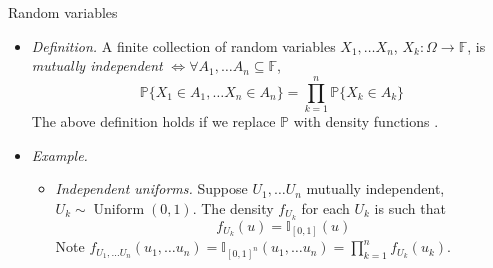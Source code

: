 \documentclass{beamer}
\numberwithin{equation}{section}
\begin{document}
\begin{frame}{Random variables}
    \begin{itemize}
        \item
        \textit{Definition.} A finite collection of random variables
        $ X_1, \ldots X_n $, $ X_k : \Omega \rightarrow \mathbb{F} $, is
        \textit{mutually independent} $ \Leftrightarrow \forall A_1, \ldots
        A_n \subseteq \mathbb{F} $,
        \begin{equation*}
            \mathbb{P}\{X_1 \in A_1, \ldots X_n \in A_n\} =
            \prod_{k = 1}^n\mathbb{P}\{X_k \in A_k\}
        \end{equation*}
        The above definition holds if we replace $ \mathbb{P} $ with density
        functions \cite{wasserman_stats}.

        \item
        \textit{Example.}
        \begin{itemize}
            \item
            \textit{Independent uniforms.} Suppose $ U_1, \ldots U_n $
            mutually independent, $ U_k \sim \operatorname{Uniform}(0, 1) $.
            The density $ f_{U_k} $ for each $ U_k $ is such that
            \begin{equation*}
                f_{U_k}(u) = \mathbb{I}_{[0, 1]}(u)
            \end{equation*}
            Note $ f_{U_1, \ldots U_n}(u_1, \ldots u_n) =
            \mathbb{I}_{[0, 1]^n}(u_1, \ldots u_n) =
            \prod_{k = 1}^nf_{U_k}(u_k) $.
        \end{itemize}
    \end{itemize}
\end{frame}
\end{document}
